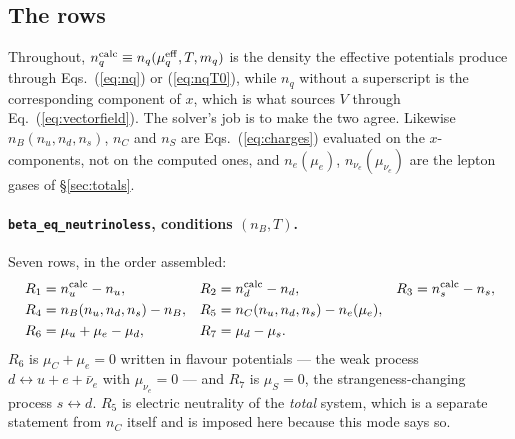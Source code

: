 \documentclass[aps,prc,onecolumn,superscriptaddress,nofootinbib,10pt]{revtex4-2}
\newcommand{\nB}{n_B}
\newcommand{\nC}{n_C}
\newcommand{\nS}{n_S}
\newcommand{\muC}{\mu_C}
\newcommand{\muS}{\mu_S}
\newcommand{\munue}{\mu_{\nu_e}}
\newcommand{\mueff}[1]{\mu^{\mathrm{eff}}_{#1}}
\begin{document}
\subsection{The rows}

Throughout, $n_q^{\rm calc} \equiv n_q(\mueff{q}, T, m_q)$ is the density the
effective potentials produce through Eqs.~(\ref{eq:nq}) or (\ref{eq:nqT0}),
while $n_q$ without a superscript is the corresponding component of $x$, which
is what sources $V$ through Eq.~(\ref{eq:vectorfield}). The solver's job is to
make the two agree. Likewise $\nB(n_u,n_d,n_s)$, $\nC$ and $\nS$ are
Eqs.~(\ref{eq:charges}) evaluated on the $x$-components, not on the computed
ones, and $n_e(\mu_e)$, $n_{\nu_e}(\munue)$ are the lepton gases of
\S\ref{sec:totals}.

\paragraph{\texttt{beta\_eq\_neutrinoless}, conditions $(\nB, T)$.}
Seven rows, in the order assembled:
%
\begin{align}
R_1 &= n_u^{\rm calc} - n_u , &
R_2 &= n_d^{\rm calc} - n_d , &
R_3 &= n_s^{\rm calc} - n_s , \notag \\
R_4 &= \nB(n_u,n_d,n_s) - \nB , &
R_5 &= \nC(n_u,n_d,n_s) - n_e(\mu_e) , \notag \\
R_6 &= \mu_u + \mu_e - \mu_d , &
R_7 &= \mu_d - \mu_s . &&
\label{eq:res:beta}
\end{align}
%
$R_6$ is $\muC + \mu_e = 0$ written in flavour potentials --- the weak process
$d \leftrightarrow u + e + \bar\nu_e$ with $\munue = 0$ --- and $R_7$ is
$\muS = 0$, the strangeness-changing process $s \leftrightarrow d$. $R_5$ is
electric neutrality of the \emph{total} system, which is a separate statement
from $\nC$ itself and is imposed here because this mode says so.
\end{document}
